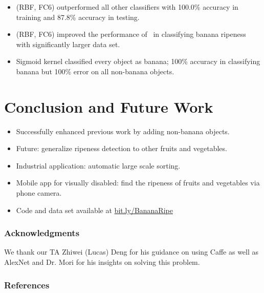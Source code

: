 \documentclass{article} %
\begin{document}
\begin{itemize}
\item (RBF, FC6)  outperformed all other classifiers with 100.0\% accuracy in training and 87.8\% accuracy in testing.
\item (RBF, FC6) improved the performance of~\citet{saad2009recognizing} in classifying banana ripeness with significantly larger data set.
\item Sigmoid kernel classified every object as banana; 100\% accuracy in classifying banana but 100\% error on all non-banana objects.
\end{itemize}
\section{Conclusion and Future Work}
\begin{itemize}
\item Successfully enhanced previous work by adding non-banana objects. 
\item Future: generalize ripeness detection to other fruits and vegetables. 
\item Industrial application: automatic large scale sorting. 
\item Mobile app for visually disabled: find the ripeness of fruits and vegetables via phone camera. 
\item Code and data set available at \href{bit.ly/BananaRipe}{bit.ly/BananaRipe}
\end{itemize}

\subsubsection*{Acknowledgments}
We thank our TA Zhiwei (Lucas) Deng for his guidance on using Caffe as well as AlexNet and Dr. Mori for his insights on solving this problem. 
 
\renewcommand\refname{\vskip -.75cm}
\subsubsection*{References}

   		    
   
\end{document}
